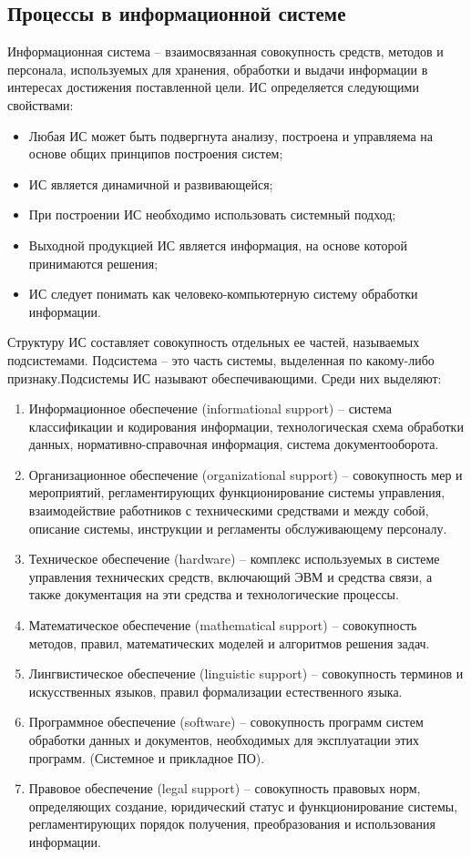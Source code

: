 \documentclass[a4paper]{article}
\begin{document}
\subsection{Процессы в информационной системе}
Информационная система – взаимосвязанная совокупность средств, методов и персонала, используемых для хранения, обработки и выдачи информации в интересах достижения поставленной цели.
  ИС определяется следующими свойствами:
  \begin{itemize}
    \item Любая ИС может быть подвергнута анализу, построена и управляема на основе общих принципов построения систем;
    \item ИС является динамичной и развивающейся;
    \item При построении ИС необходимо использовать системный подход;
    \item Выходной продукцией ИС является информация, на основе которой принимаются решения;
    \item ИС следует понимать как человеко-компьютерную систему обработки информации.
  \end{itemize}

  Структуру ИС составляет совокупность отдельных ее частей, называемых подсистемами. Подсистема – это часть системы, выделенная по какому-либо признаку.Подсистемы ИС называют обеспечивающими. Среди них выделяют:
  \begin{enumerate}
    \item Информационное обеспечение (informational support) – система классификации и кодирования информации, технологическая схема обработки данных, нормативно-справочная информация, система документооборота.
    \item Организационное обеспечение (organizational support) – совокупность мер и мероприятий, регламентирующих функционирование системы управления, взаимодействие работников с техническими средствами и между собой, описание системы, инструкции и регламенты обслуживающему персоналу.
    \item Техническое обеспечение (hardware) – комплекс используемых в системе управления технических средств, включающий ЭВМ и средства связи, а также документация на эти средства и технологические  процессы.
    \item Математическое обеспечение (mathematical support) – совокупность методов, правил, математических моделей и алгоритмов решения задач.
    \item Лингвистическое обеспечение (linguistic support) – совокупность терминов и искусственных языков, правил формализации естественного языка.
    \item Программное обеспечение (software) – совокупность программ систем обработки данных и документов, необходимых для эксплуатации этих программ. (Системное и прикладное ПО).
    \item Правовое обеспечение (legal support) – совокупность правовых норм, определяющих создание, юридический статус и функционирование системы, регламентирующих порядок получения, преобразования и использования информации.
  \end{enumerate}
\end{document}
